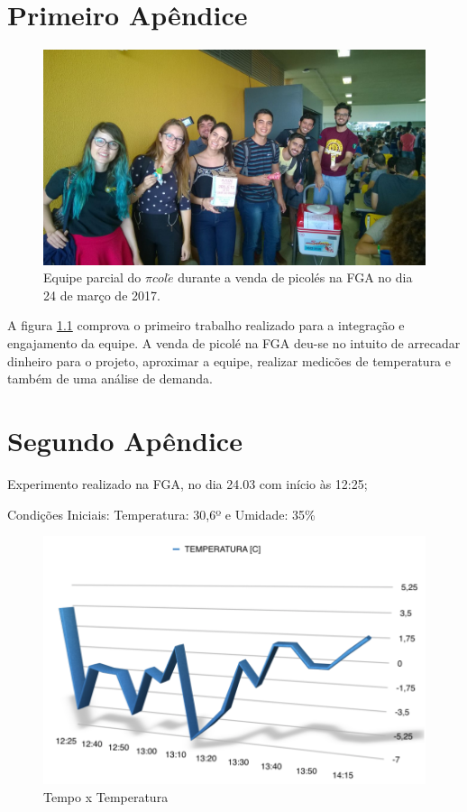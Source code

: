 \begin{apendicesenv}

\partapendices

\chapter{Primeiro Apêndice}
\label{app:pessoas}
\begin{figure}[H]
	\centering
    \includegraphics[scale=0.5]{figuras/pessoas}
    \caption{Equipe parcial do $\pi col\acute{e}$ durante a venda de picolés na FGA no dia 24 de março de 2017. }
    \label{fig:fotopessoas}
\end{figure}

A figura \ref{fig:fotopessoas} comprova o primeiro trabalho realizado para a integração e engajamento da equipe. A venda de picolé na FGA deu-se no intuito de arrecadar dinheiro para o projeto, aproximar a equipe, realizar medicões de temperatura e também de uma análise de demanda.

\chapter{Segundo Apêndice}

	Experimento realizado na FGA, no dia 24.03 com início às 12:25;

Condições Iniciais:
     	Temperatura: 30,6º e
     	Umidade: 35\%

        \begin{figure}[H]
	\centering
    \includegraphics[width=\textwidth]{figuras/temperatura}
    \caption{Tempo x Temperatura}
    \label{fig:temperatura}
\end{figure}


\end{apendicesenv}
